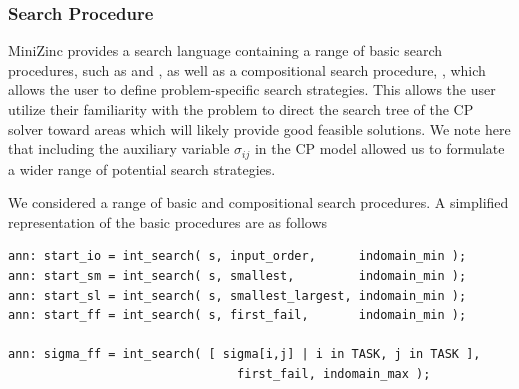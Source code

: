 
\subsubsection{Search Procedure}
\label{sec:bend:cpSearch}
MiniZinc provides a search language containing
a range of basic search procedures, 
such as \intser and \bolser,
as well as a compositional search procedure,
\seqser, which allows the user to define
problem-specific search strategies.
This allows the user utilize their
familiarity with the problem to direct the 
search tree of the CP solver toward areas
which will likely provide good feasible
solutions.
We note here that including the auxiliary 
variable $\sigma_{ij}$ in the CP model
allowed us to formulate a wider range of
potential search strategies.

We considered a range of basic and compositional
search procedures.
A simplified representation of
the basic procedures are as follows
\begin{lstlisting}[language=minizinc]
ann: start_io = int_search( s, input_order,      indomain_min );
ann: start_sm = int_search( s, smallest,         indomain_min );
ann: start_sl = int_search( s, smallest_largest, indomain_min );  
ann: start_ff = int_search( s, first_fail,       indomain_min ); 

ann: sigma_ff = int_search( [ sigma[i,j] | i in TASK, j in TASK ],
                                first_fail, indomain_max );
\end{lstlisting}%

